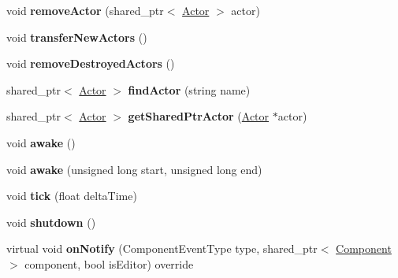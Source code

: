 \begin{DoxyCompactItemize}
\item 
\hypertarget{class_world_ab772947ef3339b95cf00b4f82c619fc4}{}void {\bfseries remove\+Actor} (shared\+\_\+ptr$<$ \hyperlink{class_actor}{Actor} $>$ actor)\label{class_world_ab772947ef3339b95cf00b4f82c619fc4}

\item 
\hypertarget{class_world_ad004978581deb7cce6f2d3cad8756b9c}{}void {\bfseries transfer\+New\+Actors} ()\label{class_world_ad004978581deb7cce6f2d3cad8756b9c}

\item 
\hypertarget{class_world_aceef86ffdf3f7de9755c5f301953304f}{}void {\bfseries remove\+Destroyed\+Actors} ()\label{class_world_aceef86ffdf3f7de9755c5f301953304f}

\item 
\hypertarget{class_world_a3c6920e71ec7fbb15fe8c7cffefab4c8}{}shared\+\_\+ptr$<$ \hyperlink{class_actor}{Actor} $>$ {\bfseries find\+Actor} (string name)\label{class_world_a3c6920e71ec7fbb15fe8c7cffefab4c8}

\item 
\hypertarget{class_world_a6055f0b0c4d37a3b67d9846fda06e3b4}{}shared\+\_\+ptr$<$ \hyperlink{class_actor}{Actor} $>$ {\bfseries get\+Shared\+Ptr\+Actor} (\hyperlink{class_actor}{Actor} $\ast$actor)\label{class_world_a6055f0b0c4d37a3b67d9846fda06e3b4}

\item 
\hypertarget{class_world_a60e6ec191ff1e441e3225d9613140c3a}{}void {\bfseries awake} ()\label{class_world_a60e6ec191ff1e441e3225d9613140c3a}

\item 
\hypertarget{class_world_a828f9be916c0b46fc12dd40aad9627eb}{}void {\bfseries awake} (unsigned long start, unsigned long end)\label{class_world_a828f9be916c0b46fc12dd40aad9627eb}

\item 
\hypertarget{class_world_ab9022595555cd6b2c2f4f34c9e855333}{}void {\bfseries tick} (float delta\+Time)\label{class_world_ab9022595555cd6b2c2f4f34c9e855333}

\item 
\hypertarget{class_world_aa317dbf6068edd413fba788777ce4549}{}void {\bfseries shutdown} ()\label{class_world_aa317dbf6068edd413fba788777ce4549}

\item 
\hypertarget{class_world_a633101f382c13b65fb7c0606cfc63cc6}{}virtual void {\bfseries on\+Notify} (Component\+Event\+Type type, shared\+\_\+ptr$<$ \hyperlink{class_component}{Component} $>$ component, bool is\+Editor) override\label{class_world_a633101f382c13b65fb7c0606cfc63cc6}


\end{DoxyCompactItemize}
